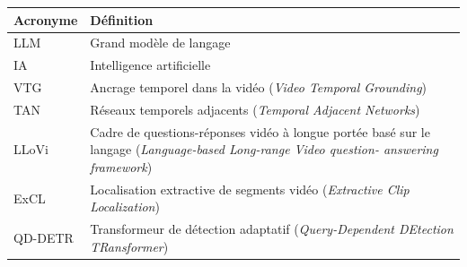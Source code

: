 \begin{center}
    \begin{tabular}{ll}
    \toprule
    \textbf{Acronyme} & \textbf{Définition} \\ \midrule
    LLM  & Grand modèle de langage   \\
    IA  & Intelligence artificielle   \\
    VTG  & Ancrage temporel dans la vidéo (\textit{Video Temporal Grounding})  \\
    TAN  & Réseaux temporels adjacents (\textit{Temporal Adjacent Networks}) \\
    LLoVi  & Cadre de questions-réponses vidéo à longue portée basé sur le langage (\textit{Language-based Long-range Video question- answering framework})  \\
    ExCL  & Localisation extractive de segments vidéo (\textit{Extractive Clip Localization}) \\
    QD-DETR  & Transformeur de détection adaptatif (\textit{Query-Dependent DEtection TRansformer})  \\
    \bottomrule
    \end{tabular}
    \end{center}
    